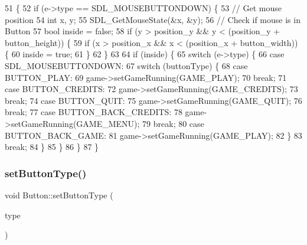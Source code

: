 \begin{DoxyCode}
51                                                   \{
52     \textcolor{keywordflow}{if} (e->type == SDL\_MOUSEBUTTONDOWN) \{
53         \textcolor{comment}{// Get mouse position}
54         \textcolor{keywordtype}{int} x, y;
55         SDL\_GetMouseState(&x, &y);
56         \textcolor{comment}{// Check if mouse is in Button}
57         \textcolor{keywordtype}{bool} inside = \textcolor{keyword}{false};
58         \textcolor{keywordflow}{if} (y > position\_y && y < (position\_y + button\_height)) \{
59             \textcolor{keywordflow}{if} (x > position\_x && x < (position\_x + button\_width)) \{
60                 inside = \textcolor{keyword}{true};
61             \}
62         \}
63 
64         \textcolor{keywordflow}{if} (inside) \{
65             \textcolor{keywordflow}{switch} (e->type) \{
66                 \textcolor{keywordflow}{case} SDL\_MOUSEBUTTONDOWN:
67                     \textcolor{keywordflow}{switch} (buttonType) \{
68                     \textcolor{keywordflow}{case} BUTTON\_PLAY:
69                         game->setGameRunning(GAME\_PLAY);
70                         \textcolor{keywordflow}{break};
71                     \textcolor{keywordflow}{case} BUTTON\_CREDITS:
72                         game->setGameRunning(GAME\_CREDITS);
73                         \textcolor{keywordflow}{break};
74                     \textcolor{keywordflow}{case} BUTTON\_QUIT:
75                         game->setGameRunning(GAME\_QUIT);
76                         \textcolor{keywordflow}{break};
77                     \textcolor{keywordflow}{case} BUTTON\_BACK\_CREDITS:
78                         game->setGameRunning(GAME\_MENU);
79                         \textcolor{keywordflow}{break};
80                     \textcolor{keywordflow}{case} BUTTON\_BACK\_GAME:
81                         game->setGameRunning(GAME\_PLAY);
82                     \}
83                 \textcolor{keywordflow}{break};
84             \}
85         \}
86     \}
87 \}
\end{DoxyCode}
\mbox{\label{class_button_a9d08f75c72f8ba5eddb857cbae0d4c77}} 
\subsubsection{\texorpdfstring{set\+Button\+Type()}{setButtonType()}}
{\footnotesize\ttfamily void Button\+::set\+Button\+Type (\begin{DoxyParamCaption}\item[{Button\+Type}]{type }\end{DoxyParamCaption})}


